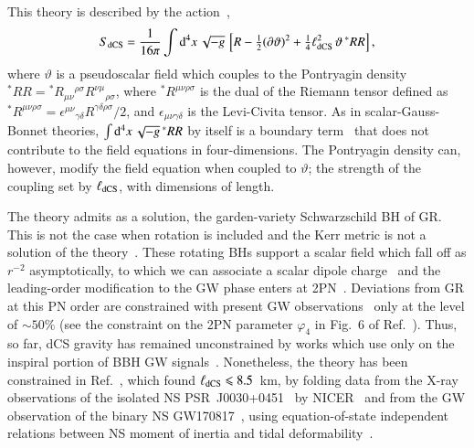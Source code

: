 \documentclass[twocolumn,
               prd,
               aps,
               superscriptaddress,
               tightenlines,
               nofootinbib,
               eqsecnum,
               amsfonts,
               amsmath,
               longbibliography]{revtex4-1}
\newcommand{\dV}{{\rm d}^{4}x \, \sqrt{-g} \,}
\begin{document}
This theory is described by the action~\cite{Jackiw:2003pm,Alexander:2009tp},
%
\begin{align} \label{eq:action_dcs}
    S_{\rm dCS} = \frac{1}{16 \pi}
    \int \dV
    \left[
    R - \tfrac{1}{2}(\partial \vartheta)^2
    + \tfrac{1}{4} \ell^{2}_{\rm dCS} \, \vartheta \, {}^{*}RR
    \right],
    \nonumber \\
\end{align}
%
where $\vartheta$ is a pseudoscalar field which couples to the Pontryagin
density
${}^{*}RR = {}^{*}R_{\mu\nu}{}^{\rho\sigma} R^{\nu\mu}{}_{\rho\sigma}$,
%
where ${}^{*}R^{\mu\nu\rho\sigma}$ is the dual of the Riemann tensor
defined as
%
${}^{*}R^{\mu\nu\rho\sigma} =
\epsilon^{\mu\nu}{}_{\gamma\delta}
R^{\gamma\delta\rho\sigma} / 2$,
%
and $\epsilon_{\mu\nu\gamma\delta}$ is the Levi-Civita tensor.
%
As in scalar-Gauss-Bonnet theories, $\int \dV {}^{*}RR$ by itself is a boundary
term~\cite{Jackiw:2003pm} that does not contribute to the field equations in
four-dimensions.
%
The Pontryagin density can, however, modify the field equation when coupled to $\vartheta$;
the strength of the coupling set by $\ell_{\rm dCS}$, with dimensions of length.
%

The theory admits as a solution, the garden-variety Schwarzschild BH of GR.
This is not the case when rotation is included and the Kerr metric is not a
solution of the theory~\cite{Jackiw:2003pm}.
%
These rotating BHs support a scalar field which fall off as
$r^{-2}$ asymptotically, to which we can associate a scalar dipole
charge~\cite{Yunes:2009hc,Konno:2009kg} and
%
the leading-order modification to the GW phase enters at 2PN~\cite{Yagi:2011xp}.
%
Deviations from GR at this PN order are constrained with present GW observations~\cite{LIGOScientific:2021sio}
only at the level of $\sim 50\%$ (see the constraint on the 2PN parameter $\varphi_4$ in Fig.~6 of
Ref.~\cite{LIGOScientific:2021sio}). Thus, so far, dCS gravity has remained
unconstrained by works which use only on the inspiral portion of BBH GW signals~\cite{Nair:2019iur,Perkins:2021mhb}.
%
Nonetheless, the theory has been constrained in Ref.~\cite{Silva:2020acr}, which found
%
$\ell_{\rm dCS} \leqslant 8.5$~km,
%
by folding data from the X-ray observations of the isolated NS
PSR~J0030+0451~\cite{Lommen:2000yt,NANOGrav:2017wvv} by
NICER~\cite{Riley:2019yda,Miller:2019cac} and from the GW observation of the binary
NS GW170817~\cite{TheLIGOScientific:2017qsa,LIGOScientific:2018cki}, using
equation-of-state independent relations between NS moment of inertia and tidal deformability~\cite{Yagi:2013bca,Yagi:2013awa,Gupta:2017vsl}.
\end{document}
